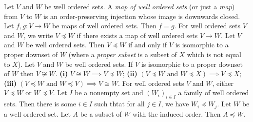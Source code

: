  Let $V$ and $W$ be well ordered sets. A \textit{map of well ordered sets} (or just a \textit{map}) from $V$ to $W$ is an order-preserving injection whose image is downwards closed.
 Let $f, g \colon V \to W$ be maps of well ordered sets. Then $f = g$.
 For well ordered sets $V$ and $W$, we write $V \preceq W$ if there exists a map of well ordered sets $V \to W$.
 Let $V$ and $W$ be well ordered sets. Then $V \preceq W$ if and only if $V$ is isomorphic to a proper downset of $W$ (where a \textit{proper subset} is a subset of $X$ which is not equal to $X$).
 Let $V$ and $W$ be well ordered sets. If $V$ is isomorphic to a proper downset of $W$ then $V \not \cong W$.
 \textbf{(i)} $V \cong W \implies V \preceq W$; \textbf{(ii)} $(V \preceq W \text{ and } W \preceq X) \implies V \preceq X$; \textbf{(iii)} $(V \preceq W \text{ and } W \preceq V) \implies V \cong W$. 
 For well ordered sets $V$ and $W$, either $V \preceq W$ or $W \preceq V$.
 Let $I$ be a nonempty set and $(W_i)_{i \in I}$ a family of well ordered sets. Then there is some $i \in I$ such thtat for all $j \in I$, we have $W_i \preceq W_j$.
 Let $W$ be a well ordered set. Let $A$ be a subset of $W$ with the induced order. Then $A \preceq W$.
